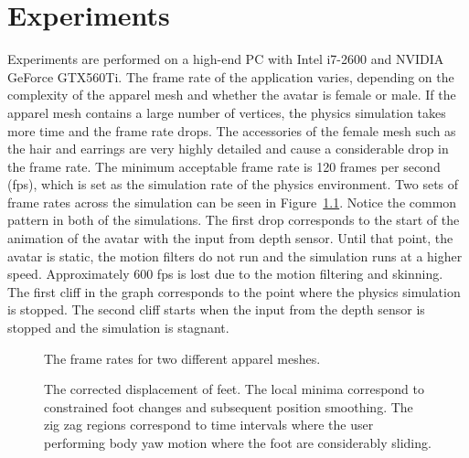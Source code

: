 \chapter{Experiments}
\label{chapter_experiments}
 
Experiments are performed on a high-end PC with Intel i7-2600 and NVIDIA GeForce GTX560Ti. The frame rate of the application varies, depending on the complexity of the apparel mesh and whether the avatar is female or male. If the apparel mesh contains a large number of vertices, the physics simulation takes more time and the frame rate drops. The accessories of the female mesh such as the hair and earrings are very highly detailed and cause a considerable drop in the frame rate. The minimum acceptable frame rate is 120 frames per second (fps), which is set as the simulation rate of the physics environment. Two sets of frame rates across the simulation can be seen in Figure~\ref{fig:fps}. Notice the common pattern in both of the simulations. The first drop corresponds to the start of the animation of the avatar with the input from depth sensor. Until that point, the avatar is static, the motion filters do not run and the simulation runs at a higher speed. Approximately 600 fps is lost due to the motion filtering and skinning. The first cliff in the graph corresponds to the point where the physics simulation is stopped. The second cliff starts when the input from the depth sensor is stopped and the simulation is stagnant.  

\begin{figure}[htbp]
	\begin{center} 
	\end{center}
	\caption{The frame rates for two different apparel meshes. }
	\label{fig:fps}
\end{figure}
 
 
\begin{figure}[htbp]
	\begin{center} 
	\end{center}
	\caption{The corrected displacement of feet. The local minima correspond to constrained foot changes and subsequent 
	position smoothing. The zig zag regions correspond to time intervals where the user performing body yaw motion where 
	the foot are considerably sliding.}
	\label{fig:footskating}
\end{figure}


